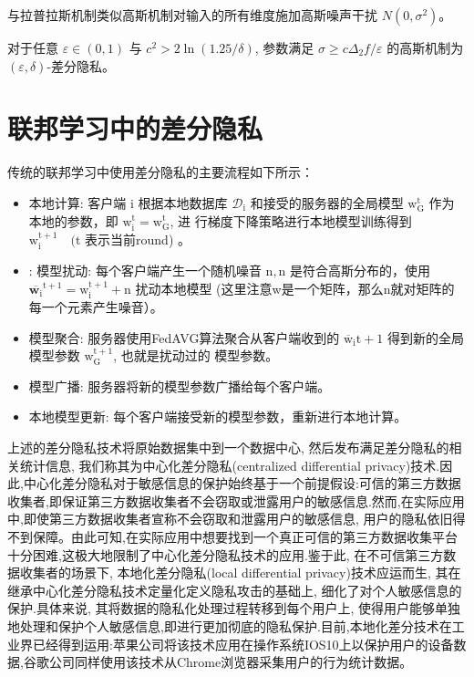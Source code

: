 与拉普拉斯机制类似高斯机制对输入的所有维度施加高斯噪声干扰 $N\left(0, \sigma^{2}\right)$。
\begin{define}[高斯机制]\label{高斯机制}
对于任意 $\varepsilon \in(0,1)$ 与 $c^{2}>2 \ln (1.25 / \delta)$, 参数满足 $\sigma \geq c \Delta_{2} f / \varepsilon$ 的高斯机制为 $(\varepsilon, \delta)$-差分隐私。
\end{define}

\section{联邦学习中的差分隐私}
传统的联邦学习中使用差分隐私的主要流程如下所示：
\begin{itemize}
\item 本地计算:
客户端 $\mathrm{i}$ 根据本地数据库 $\mathcal{D}_{\mathrm{i}}$ 和接受的服务器的全局模型 $\mathrm{w}_{\mathrm{G}}^{\mathrm{t}}$ 作为本地的参数，即 $\mathrm{w}_{\mathrm{i}}^{\mathrm{t}}=\mathrm{w}_{\mathrm{G}}^{\mathrm{t}}$, 进 行梯度下降策略进行本地模型训练得到 $\mathrm{w}_{\mathrm{i}}^{\mathrm{t}+1} \quad(\mathrm{t}$ 表示当前round) 。

\item: 模型扰动:
每个客户端产生一个随机噪音 $\mathrm{n}, \mathrm{n}$ 是符合高斯分布的，使用 $\overline{\mathbf{w}_{\mathrm{i}}}^{\mathrm{t}+1}=\mathrm{w}_{\mathrm{i}}^{\mathrm{t}+1}+\mathrm{n}$ 扰动本地模型 (这里注意w是一个矩阵，那么n就对矩阵的每一个元素产生噪音）。

\item 模型聚合:
服务器使用FedAVG算法聚合从客户端收到的 $\overline{\mathrm{w}}_{\mathrm{i}} \mathrm{t}+1$ 得到新的全局模型参数 $\mathrm{w}_{\mathrm{G}}^{\mathrm{t}+1}$, 也就是扰动过的 模型参数。

\item 模型广播:
服务器将新的模型参数广播给每个客户端。

\item 本地模型更新:
每个客户端接受新的模型参数，重新进行本地计算。
\end{itemize}

上述的差分隐私技术将原始数据集中到一个数据中心, 然后发布满足差分隐私的相关统计信息, 我们称其为中心化差分隐私(centralized differential privacy)技术.因此,中心化差分隐私对于敏感信息的保护始终基于一个前提假设:可信的第三方数据收集者,即保证第三方数据收集者不会窃取或泄露用户的敏感信息.然而,在实际应用中,即使第三方数据收集者宣称不会窃取和泄露用户的敏感信息, 用户的隐私依旧得不到保障。由此可知,在实际应用中想要找到一个真正可信的第三方数据收集平台十分困难,这极大地限制了中心化差分隐私技术的应用.鉴于此, 在不可信第三方数据收集者的场景下, 本地化差分隐私(local differential privacy)\cite{ref32}\cite{ref33}技术应运而生, 其在继承中心化差分隐私技术定量化定义隐私攻击的基础上, 细化了对个人敏感信息的保护.具体来说, 其将数据的隐私化处理过程转移到每个用户上, 使得用户能够单独地处理和保护个人敏感信息,即进行更加彻底的隐私保护.目前,本地化差分技术在工业界已经得到运用:苹果公司将该技术应用在操作系统IOS10上以保护用户的设备数据,谷歌公司同样使用该技术从Chrome浏览器采集用户的行为统计数据\cite{ref34}。


